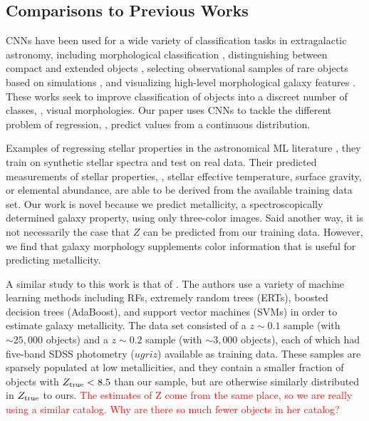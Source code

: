 \documentclass[fleqn,usenatbib]{mnras}
\newcommand{\editorial}[1]{\textcolor{red}{#1}}
\begin{document}
\subsection{Comparisons to Previous Works}\label{sec:previous work}
CNNs have been used for a wide variety of classification tasks in extragalactic astronomy, including morphological classification , distinguishing between compact and extended objects \citep{Kim2017}, selecting observational samples of rare objects based on simulations \citep{Huertas-Company2018, Lanusse2017}, and visualizing high-level morphological galaxy features \citep{Dai2018}. These works seek to improve classification of objects into a discreet number of classes, \ie, visual morphologies. Our paper uses CNNs to tackle the different problem of regression, \ie, predict values from a continuous distribution.

Examples of regressing stellar properties in the astronomical ML literature , they train on synthetic stellar spectra and test on real data. Their predicted measurements of stellar properties, \eg, stellar effective temperature, surface gravity, or elemental abundance, are able to be derived from the available training data set. Our work is novel because we predict metallicity, a spectroscopically determined galaxy property, using only three-color images. Said another way, it is not necessarily the case that $Z$ can be predicted from our training data. However, we find that galaxy morphology supplements color information that is useful for predicting metallicity.

A similar study to this work is that of \cite{Acquaviva2016}. The authors use a variety of machine learning methods including RFs, extremely random trees (ERTs), boosted decision trees (AdaBoost), and support vector machines (SVMs) in order to estimate galaxy metallicity. The \cite{Acquaviva2016} data set consisted of a $z \sim 0.1$ sample (with $\sim 25,000$ objects) and a $z \sim 0.2$ sample (with $\sim 3,000$ objects), each of which had five-band SDSS photometry ($ugriz$) available as training data. These samples are sparsely populated at low metallicities, and they contain a smaller fraction of objects with $Z_{\rm true} < 8.5$ than our sample, but are otherwise similarly distributed in $Z_{\rm true}$ to ours. \editorial{The estimates of Z come from the same place, so we are really using a similar catalog. Why are there so much fewer objects in her catalog?}
\end{document}
